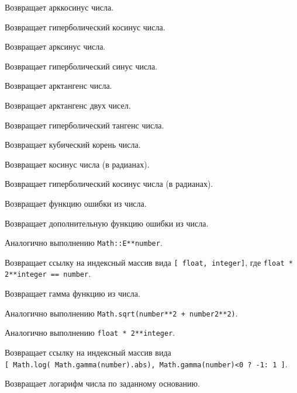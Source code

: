 \begin{methodlist}
  Возвращает арккосинус числа.

  Возвращает гиперболический косинус числа.

  Возвращает арксинус числа. 

  Возвращает гиперболический синус числа.

  Возвращает арктангенс числа.

  Возвращает арктангенс двух чисел.

  Возвращает гиперболический тангенс числа.

  Возвращает кубический корень числа.

  Возвращает косинус числа (в радианах).

  Возвращает гиперболический косинус числа (в радианах).

  Возвращает функцию ошибки из числа.

  Возвращает дополнительную функцию ошибки из числа.

  Аналогично выполнению \verb!Math::E**number!.

  Возвращает ссылку на индексный массив вида \verb![ float, integer]!, где \verb!float * 2**integer == number!.

  Возвращает гамма функцию из числа.

  Аналогично выполнению \verb!Math.sqrt(number**2 + number2**2)!.

  Аналогично выполнению \verb!float * 2**integer!.

  Возвращает ссылку на индексный массив вида 
  \\\verb![ Math.log( Math.gamma(number).abs), Math.gamma(number)<0 ? -1: 1 ]!.

  Возвращает логарифм числа по заданному основанию.


\end{methodlist}
